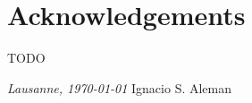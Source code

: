 \chapter*{Acknowledgements}

TODO

\bigskip
 
\noindent\textit{Lausanne, \today}
\hfill Ignacio S. Aleman
